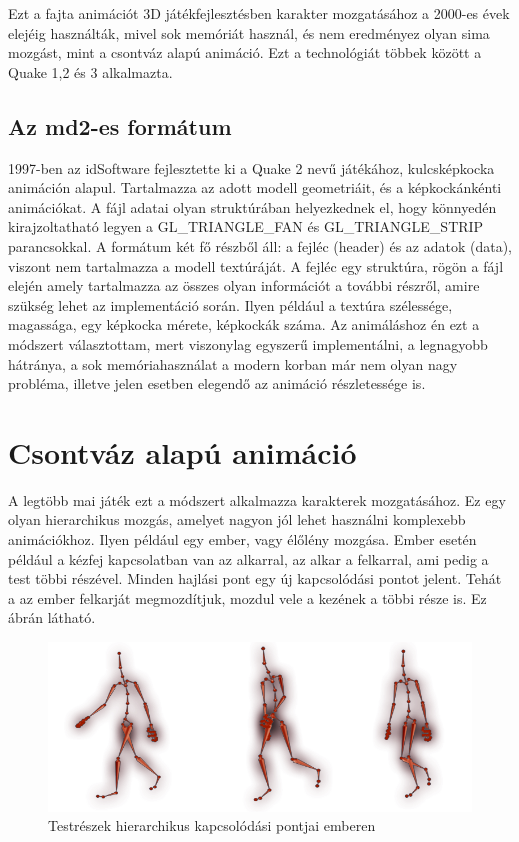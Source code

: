Ezt a fajta animációt 3D játékfejlesztésben karakter mozgatásához a 2000-es évek elejéig használták, mivel sok memóriát használ, és nem eredményez olyan sima mozgást, mint a csontváz alapú animáció. Ezt a technológiát többek között a Quake 1,2 és 3 alkalmazta.

\subsection{Az md2-es formátum}

1997-ben az idSoftware fejlesztette ki a Quake 2 nevű játékához, kulcsképkocka animáción alapul. Tartalmazza az adott modell geometriáit, és a képkockánkénti animációkat. A fájl adatai olyan struktúrában helyezkednek el, hogy könnyedén kirajzoltatható legyen a GL\_TRIANGLE\_FAN és GL\_TRIANGLE\_STRIP parancsokkal. A formátum két fő részből áll: a fejléc (header) és az adatok (data), viszont nem tartalmazza a modell textúráját. A fejléc egy struktúra, rögön a fájl elején amely tartalmazza az összes olyan információt a további részről, amire szükség lehet az implementáció során. Ilyen például a textúra szélessége, magassága, egy képkocka mérete, képkockák száma. Az animáláshoz én ezt a módszert választottam, mert viszonylag egyszerű implementálni, a legnagyobb hátránya, a sok memóriahasználat a modern korban már nem olyan nagy probléma, illetve jelen esetben elegendő az animáció részletessége is. 

\section{Csontváz alapú animáció}

A legtöbb mai játék ezt a módszert alkalmazza karakterek mozgatásához. Ez egy olyan hierarchikus mozgás, amelyet nagyon jól lehet használni komplexebb animációkhoz. Ilyen például egy ember, vagy élőlény mozgása. Ember esetén például a kézfej kapcsolatban van az alkarral, az alkar a felkarral, ami pedig a test többi részével. Minden hajlási pont egy új kapcsolódási pontot jelent. Tehát a az ember felkarját megmozdítjuk, mozdul vele a kezének a többi része is. Ez  ábrán látható.


\begin{figure}[h]
\centering
\includegraphics[scale=0.5]{kepek/skeletal_anim.png}
\caption{Testrészek hierarchikus kapcsolódási pontjai emberen}
\label{fig:skeletal}
\end{figure}

